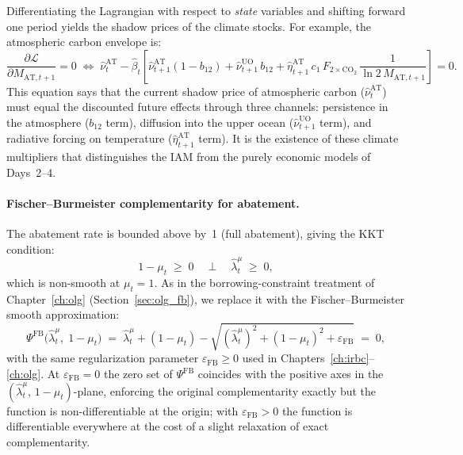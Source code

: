 \documentclass[11pt,a4paper]{report}
\begin{document}
Differentiating the Lagrangian with respect to \emph{state} variables and shifting forward one period yields the shadow prices of the climate stocks.  For example, the atmospheric carbon envelope is:
\begin{equation}
\frac{\partial \mathcal{L}}{\partial M_{\mathrm{AT},t+1}} = 0 \;\Leftrightarrow\;
\hat{\nu}^{\mathrm{AT}}_t - \hat{\beta}_t\!\left[\hat{\nu}^{\mathrm{AT}}_{t+1}(1-b_{12}) + \hat{\nu}^{\mathrm{UO}}_{t+1}\,b_{12} + \hat{\eta}^{\mathrm{AT}}_{t+1}\,c_1\,F_{\mathrm{2\times CO_2}}\,\frac{1}{\ln 2\,M_{\mathrm{AT},t+1}}\right] = 0.
\label{eq:iam_env_mat}
\end{equation}
This equation says that the current shadow price of atmospheric carbon ($\hat{\nu}^{\mathrm{AT}}_t$) must equal the discounted future effects through three channels: persistence in the atmosphere ($b_{12}$ term), diffusion into the upper ocean ($\hat{\nu}^{\mathrm{UO}}_{t+1}$ term), and radiative forcing on temperature ($\hat{\eta}^{\mathrm{AT}}_{t+1}$ term).  It is the existence of these climate multipliers that distinguishes the IAM from the purely economic models of Days~2--4.

\paragraph{Fischer--Burmeister complementarity for abatement.}
The abatement rate is bounded above by~1 (full abatement), giving the KKT condition:
\begin{equation}
1 - \mu_t \;\geq\; 0 \quad\perp\quad \hat{\lambda}^\mu_t \;\geq\; 0,
\label{eq:iam_kkt_mu}
\end{equation}
which is non-smooth at $\mu_t = 1$.  As in the borrowing-constraint treatment of Chapter~\ref{ch:olg} (Section~\ref{sec:olg_fb}), we replace it with the Fischer--Burmeister smooth approximation:
\begin{equation}
\Psi^{\mathrm{FB}}\!\bigl(\hat{\lambda}^\mu_t,\; 1-\mu_t\bigr)
\;=\; \hat{\lambda}^\mu_t + (1-\mu_t) - \sqrt{(\hat{\lambda}^\mu_t)^2 + (1-\mu_t)^2 + \varepsilon_{\mathrm{FB}}} \;=\; 0,
\label{eq:iam_fb}
\end{equation}
with the same regularization parameter $\varepsilon_{\mathrm{FB}} \geq 0$ used in Chapters~\ref{ch:irbc}--\ref{ch:olg}.  At $\varepsilon_{\mathrm{FB}} = 0$ the zero set of $\Psi^{\mathrm{FB}}$ coincides with the positive axes in the $(\hat{\lambda}^\mu_t,\, 1-\mu_t)$-plane, enforcing the original complementarity exactly but the function is non-differentiable at the origin; with $\varepsilon_{\mathrm{FB}} > 0$ the function is differentiable everywhere at the cost of a slight relaxation of exact complementarity.
\end{document}
